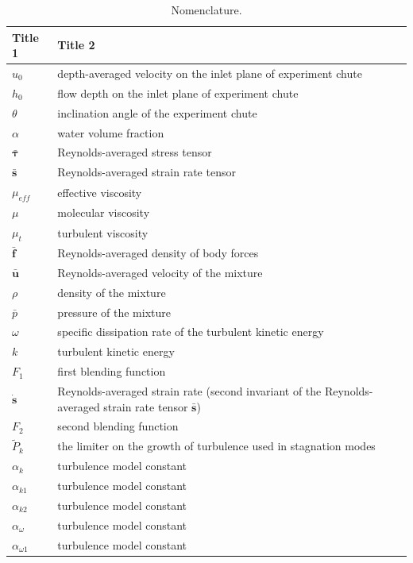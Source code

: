 \documentclass[mathematics,article,submit,pdftex,moreauthors]{Definitions/mdpi}
\begin{document}
\begin{table}[H] 
\caption{Nomenclature.\label{A:tab1}}
\begin{tabularx}{\textwidth}{ll}
\toprule
\textbf{Title 1}	& \textbf{Title 2}	\\
\midrule
$u_0$		& depth-averaged velocity on the inlet plane of experiment chute	\\
$h_0$		& flow depth on the inlet plane of experiment chute	\\
$\theta$	& inclination angle of the experiment chute \\
$\alpha$	& water volume fraction	\\
$\bar{\boldsymbol{\tau}}$	& Reynolds-averaged stress tensor	\\
$\bar{\boldsymbol{s}}$		& Reynolds-averaged strain rate tensor	\\
$\mu_{eff}$		& effective viscosity	\\
$\mu$		& molecular viscosity	\\
$\mu_{t}$		& turbulent viscosity	\\
$\bar{\boldsymbol{f}}$		& Reynolds-averaged density of body forces	\\
$\bar{\boldsymbol{u}}$		& Reynolds-averaged velocity of the mixture	\\
$\rho$		& density of the mixture	\\
$\bar{p}$		& pressure of the mixture	\\
$\omega$		& specific dissipation rate of the turbulent kinetic energy	\\
$k$		& 	turbulent kinetic energy \\
$F_1$		& first blending function	\\
$\dot{\boldsymbol{s}}$		& Reynolds-averaged strain rate (second invariant of the Reynolds-averaged strain rate tensor $\bar{\boldsymbol{s}}$)	\\
$F_2$		& second blending function	\\
$\widetilde{P}_k$ & the limiter on the growth of turbulence used in stagnation modes \\
$\alpha_k$ & turbulence model constant \\
$\alpha_{k1}$ & turbulence model constant \\
$\alpha_{k2}$ & turbulence model constant \\
$\alpha_\omega$ & turbulence model constant \\
$\alpha_{\omega1}$ & turbulence model constant \\

\end{tabularx}
\end{table}
\end{document}
